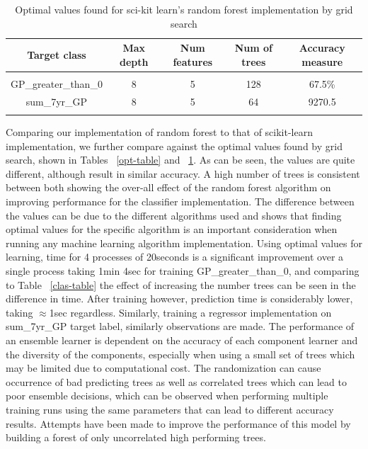 \documentclass{article} %
\begin{document}
\begin{table}[h]
\caption{Optimal values found for sci-kit learn's random forest implementation by grid search}
\begin{center}
\begin{tabular}{ccccc}
{\bf Target class} &{\bf Max depth} &{\bf Num features} &{\bf Num of trees}&{\bf Accuracy measure}
\\ \hline \\
GP\_greater\_than\_0         &8	&5 &128 &67.5\%\\
sum\_7yr\_GP         &8	&5 &64 &9270.5\\
\label{scikit-table}
\end{tabular}
\end{center}
\end{table}

Comparing our implementation of random forest to that of scikit-learn implementation, we further compare against the optimal values found by grid search, shown in Tables ~\ref{opt-table} and ~\ref{scikit-table}. As can be seen, the values are quite different, although result in similar accuracy. A high number of trees is consistent between both showing the over-all effect of the random forest algorithm on improving performance for the classifier implementation. The difference between the values can be due to the different algorithms used and shows that finding optimal values for the specific algorithm is an important consideration when running any machine learning algorithm implementation. Using optimal values for learning, time for 4 processes of 20seconds is a significant improvement over a single process taking 1min 4sec for training GP\_greater\_than\_0, and comparing to Table ~\ref{clas-table} the effect of increasing the number trees can be seen in the difference in time. After training however, prediction time is considerably lower, taking $\approx$1sec regardless. Similarly, training a regressor implementation on sum\_7yr\_GP target label, similarly observations are made. The performance of an ensemble learner is dependent on the accuracy of each component learner and the diversity of the components, especially when using a small set of trees which may be limited due to computational cost. The randomization can cause occurrence of bad predicting trees as well as correlated trees which can lead to poor ensemble decisions, which can be observed when performing multiple training runs using the same parameters that can lead to different accuracy results. Attempts have been made to improve the performance of this model by building a forest of only uncorrelated high performing trees. \cite{Bharathidason2014}
\end{document}
